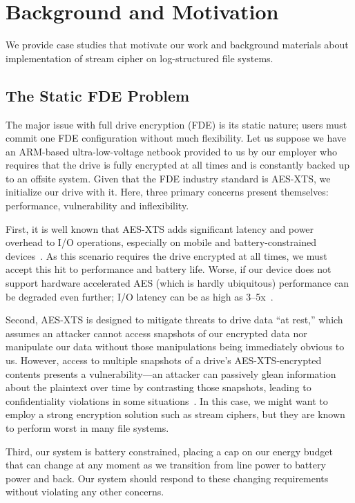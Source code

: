 \section{Background and Motivation}\label{sec:motivation}

We provide \numCases case studies that motivate our work and background
materials about implementation of stream cipher on log-structured file systems.


\subsection{The Static FDE Problem}

The major issue with full drive encryption (FDE) is its static nature; users
must commit one FDE configuration without much flexibility. Let us suppose we
have an ARM-based ultra-low-voltage netbook provided to us by our employer who
requires that the drive is fully encrypted at all times and is constantly backed
up to an offsite system. Given that the FDE industry standard is AES-XTS, we
initialize our drive with it. Here, three primary concerns present themselves:
performance, vulnerability and inflexibility.

First, it is well known that AES-XTS adds significant latency and power overhead
to I/O operations, especially on mobile and battery-constrained
devices~\cite{google-engadget, android-M-mobile-motivation,
android-M-mobile-motivation-2}. As this scenario requires the drive encrypted at
all times, we must accept this hit to performance and battery life. Worse, if
our device does not support hardware accelerated AES (which is hardly
ubiquitous) performance can be degraded even further; I/O latency can be as high
as 3--5x~\cite{StrongBox}.

Second, AES-XTS is designed to mitigate threats to drive data ``at rest,'' which
assumes an attacker cannot access snapshots of our encrypted data nor manipulate
our data without those manipulations being immediately obvious to us. However,
access to multiple snapshots of a drive's AES-XTS-encrypted contents presents a
vulnerability---an attacker can passively glean information about the plaintext
over time by contrasting those snapshots, leading to confidentiality violations
in some situations~\cite{XEX, XTS}. In this case, we might want to employ a
strong encryption solution such as stream ciphers, but they are known to perform
worst in many file systems.

Third, our system is battery constrained, placing a cap on our energy budget
that can change at any moment as we transition from line power to battery power
and back. Our system should respond to these changing requirements without
violating any other concerns.



